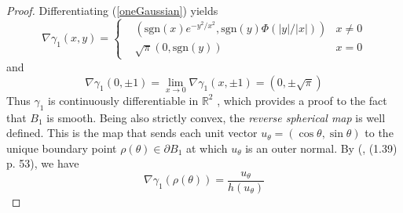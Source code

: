 \documentclass{article}[1100]
\theoremstyle{definition}
\theoremstyle{remark}
\newcommand\sgn{\text{sgn}}
\newcommand\Ren[1]{\mathbb{R}^{#1}}
\begin{document}
\begin{proof}
Differentiating (\ref{oneGaussian}) yields 
\begin{equation}\label{oneGaussianNormGradient}
\nabla\gamma_1(x,y)=
\left\{
\begin{aligned}
&(\sgn(x)e^{-y^2/x^2},\sgn(y)\Phi(|y|/|x|))& x\neq 0\\
&\sqrt{\pi}(0,\sgn(y)) & x=0
\end{aligned}
\right.
\end{equation}
and
\begin{equation}\label{gradientAtEndPoints}
\nabla \gamma_1(0,\pm 1)=\lim_{x\to 0}\nabla\gamma_1(x,\pm 1)=(0,\pm \sqrt{\pi})
\end{equation}
Thus $\gamma_1$ is continuously differentiable in $\Ren{2}$ , which provides a  proof to the fact that $B_1$ is smooth. Being also strictly convex, the \emph{reverse spherical map} is well defined. This is the map that sends each unit vector $u_\theta=(\cos\theta,\sin\theta)$ to the unique boundary point ${\rho(\theta)\in \partial B_1}$ at which $u_\theta$ is an outer normal. By (\cite{SchneiderBook}, (1.39) p. 53), we have
\begin{equation}\label{SchneidersFormula}
\nabla\gamma_1(\rho(\theta))=\frac{u_\theta }{h(u_\theta)}
\end{equation}


\end{proof}
\end{document}
